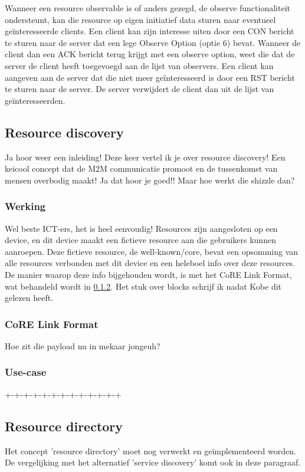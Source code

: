 Wanneer een resource observable is of anders gezegd, de observe functionaliteit ondersteunt, kan die resource op eigen initiatief data sturen naar eventueel ge\"{i}nteresseerde clients. Een client kan zijn interesse uiten door een CON bericht te sturen naar de server dat een lege Observe Option (optie 6) bevat. Wanneer de client dan een ACK bericht terug krijgt met een observe option, weet die dat de server de client heeft toegevoegd aan de lijst van observers. Een client kan aangeven aan de server dat die niet meer ge\"{i}nteresseerd is door een RST bericht te sturen naar de server. De server verwijdert de client dan uit de lijst van ge\"{i}nteresseerden.

\subsection{Resource discovery} \label{resourceDiscovery}
Ja hoor weer een inleiding! Deze keer vertel ik je over resource discovery! Een keicool concept dat de M2M communicatie promoot en de tussenkomst van mensen overbodig maakt! Ja dat hoor je goed!! Maar hoe werkt die shizzle dan?

\subsubsection{Werking}
Wel beste ICT-ers, het is heel eenvoudig! Resources zijn aangesloten op een device, en dit device maakt een fictieve resource aan die gebruikers kunnen aanroepen. Deze fictieve resource, de well-known/core, bevat een opsomming van alle resources verbonden met dit device en een heleboel info over deze resources. De manier waarop deze info bijgehouden wordt, is met het CoRE Link Format, wat behandeld wordt in \ref{coreLinkFormat}.
Het stuk over blocks schrijf ik nadat Kobe dit gelezen heeft.


\subsubsection{CoRE Link Format} \label{coreLinkFormat}
Hoe zit die payload nu in mekaar jongeuh?


\subsubsection{Use-case}
+-+-+-+-+-+-+-+-+-+-+-+-+

\subsection{Resource directory} %

Het concept 'resource directory' moet nog verwerkt en ge\"{i}mplementeerd worden. De vergelijking met het alternatief 'service discovery' komt ook in deze paragraaf.
